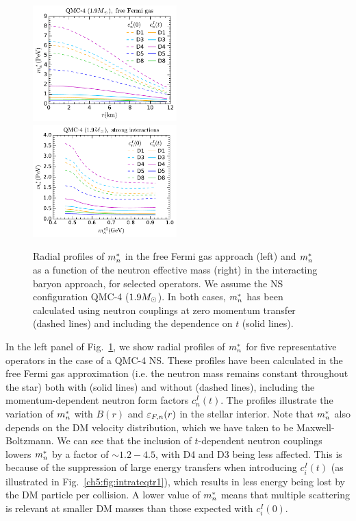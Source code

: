   \begin{figure}[t!bp]
    \centering
\includegraphics[width=0.495\textwidth]{capture_3/mnstar_r_QMC4_free_Fermi.pdf}    
\includegraphics[width=0.495\textwidth]{capture_3/mnstar_mn_QMC4.pdf}
    \caption[Radial profiles of $\mnstar$ in the free Fermi gas approach (left) and $\mnstar$ as a function of the neutron effective mass (right) in the interacting baryon approach, for selected operators.]{Radial profiles of $\mnstar$ in the free Fermi gas approach (left) and $\mnstar$ as a function of the neutron effective mass (right) in the interacting baryon approach, for selected operators. We assume the NS configuration QMC-4 ($1.9M_\odot$). In both cases, $\mnstar$ has been calculated using neutron couplings at zero momentum transfer (dashed lines) and including the dependence on $t$ (solid lines). }
    \label{ch5:fig:mstar}
\end{figure}


In the left panel of Fig.~\ref{ch5:fig:mstar}, we show radial profiles of $\mnstar$ for five representative operators in the case of a QMC-4 NS. These profiles have been calculated in the free Fermi gas approximation (i.e. the neutron mass remains constant throughout the star) both with (solid lines) and without (dashed lines), including the momentum-dependent neutron form factors $c_n^I(t)$. 
The profiles illustrate the variation of $\mnstar$ with $B(r)$ and $\varepsilon_{F,n}(r)$ in the stellar interior. Note that $\mnstar$ also depends on the  DM velocity distribution, which we have taken to be Maxwell-Boltzmann. We can see that the inclusion of $t$-dependent neutron couplings lowers $\mnstar$ by a factor of $\sim 1.2 - 4.5$, with D4 and D3 being less affected. 
This is because of the suppression of large energy transfers when introducing  $c_i^I(t)$ (as illustrated in Fig.~\ref{ch5:fig:intrateqtr1}), which results in less energy being lost by the DM particle per collision.  A lower value of $\mnstar$ means that multiple scattering is relevant at smaller DM masses than those expected with $c_i^I(0)$. 


